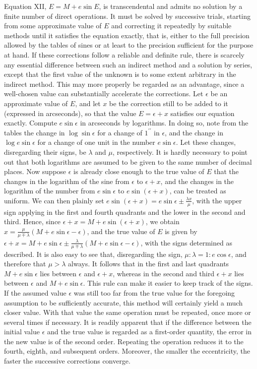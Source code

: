 Equation XII, $E = M + e\sin E$, is transcendental and admits no solution by a finite number of direct operations. It must be solved by successive trials, starting from some approximate value of $E$ and correcting it repeatedly by suitable methods until it satisfies the equation exactly, that is, either to the full precision allowed by the tables of sines or at least to the precision sufficient for the purpose at hand. If these corrections follow a reliable and definite rule, there is scarcely any essential difference between such an indirect method and a solution by series, except that the first value of the unknown is to some extent arbitrary in the indirect method. This may more properly be regarded as an advantage, since a well-chosen value can substantially accelerate the corrections. Let $\epsilon$ be an approximate value of $E$, and let $x$ be the correction still to be added to it (expressed in arcseconds), so that the value $E = \epsilon + x$ satisfies our equation exactly. Compute $e\sin\epsilon$ in arcseconds by logarithms. In doing so, note from the tables the change in $\log\sin\epsilon$ for a change of $1^{\prime\prime}$ in $\epsilon$, and the change in $\log e\sin\epsilon$ for a change of one unit in the number $e\sin\epsilon$. Let these changes, disregarding their signs, be $\lambda$ and $\mu$, respectively. It is hardly necessary to point out that both logarithms are assumed to be given to the same number of decimal places. Now suppose $\epsilon$ is already close enough to the true value of $E$ that the changes in the logarithm of the sine from $\epsilon$ to $\epsilon+x$, and the changes in the logarithm of the number from $e\sin\epsilon$ to $e\sin(\epsilon+x)$, can be treated as uniform. We can then plainly set $e\sin(\epsilon+x) = e\sin\epsilon \pm \frac{\lambda x}{\mu}$, with the upper sign applying in the first and fourth quadrants and the lower in the second and third. Hence, since $\epsilon+x = M+e\sin(\epsilon+x)$, we obtain $x = \frac{\mu}{\mu\mp\lambda}(M+e\sin\epsilon-\epsilon)$, and the true value of $E$ is given by $\epsilon+x = M+e\sin\epsilon \pm \frac{\lambda}{\mu\mp\lambda}(M+e\sin\epsilon-\epsilon)$, with the signs determined as described. It is also easy to see that, disregarding the sign, $\mu:\lambda = 1:e\cos\epsilon$, and therefore that $\mu > \lambda$ always. It follows that in the first and last quadrants $M+e\sin\epsilon$ lies between $\epsilon$ and $\epsilon+x$, whereas in the second and third $\epsilon+x$ lies between $\epsilon$ and $M+e\sin\epsilon$. This rule can make it easier to keep track of the signs. If the assumed value $\epsilon$ was still too far from the true value for the foregoing assumption to be sufficiently accurate, this method will certainly yield a much closer value. With that value the same operation must be repeated, once more or several times if necessary. It is readily apparent that if the difference between the initial value $\epsilon$ and the true value is regarded as a first-order quantity, the error in the new value is of the second order. Repeating the operation reduces it to the fourth, eighth, and subsequent orders. Moreover, the smaller the eccentricity, the faster the successive corrections converge.
